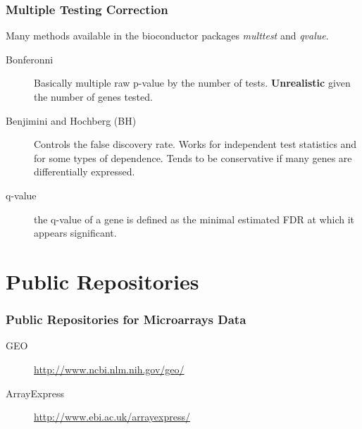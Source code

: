 \documentclass[pdf]{beamer}
\begin{document}
\begin{frame}
  \frametitle{Multiple Testing Correction}
  Many methods available in the bioconductor packages \textit{multtest} and \textit{qvalue}.
  \begin{description}
  \item[Bonferonni] Basically multiple raw p-value by the number of tests. \textbf{Unrealistic} given the number of genes tested.
  \item [Benjimini and Hochberg (BH)] Controls the false discovery rate. Works for independent test statistics and for some types of dependence. Tends to be conservative if many genes are differentially expressed.  
  \item [q-value] the q-value of a gene is defined as the minimal estimated FDR at which it appears significant.
  \end{description}
\end{frame}

\section{Public Repositories}
\begin{frame}
  \frametitle{Public Repositories for Microarrays Data}
  \begin{description}
    \item[GEO] \href{http://www.ncbi.nlm.nih.gov/geo/}{http://www.ncbi.nlm.nih.gov/geo/}
	\newline
    \item[ArrayExpress] \href{http://www.ebi.ac.uk/arrayexpress/}{http://www.ebi.ac.uk/arrayexpress/}
  \end{description}  
\end{frame}
\end{document}
